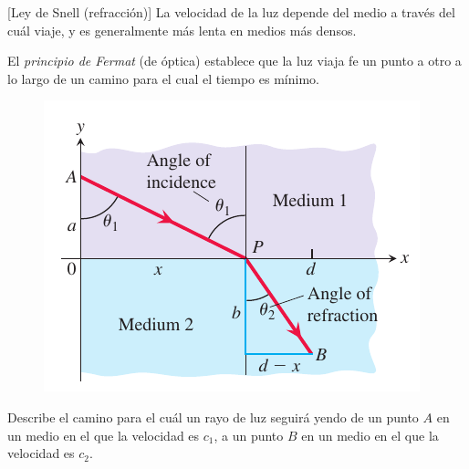 [Ley de Snell (refracción)]
	La velocidad de la luz depende del medio a través del cuál viaje, y es generalmente más lenta en medios más densos.



	El \emph{principio de Fermat} (de óptica) establece que la luz viaja fe un punto a otro a lo largo de un camino para el cual el tiempo es mínimo.




		\begin{figure}
		\centering
		\includegraphics[height=.7\textheight]{./calculo/thomas_04_41}
		\caption{}
		\label{fig:thomas0441}
	\end{figure}
	Describe el camino para el cuál un rayo de luz seguirá yendo de un punto $A$ en un medio en el que la velocidad es $c_1$, a un punto $B$ en un medio en el que la velocidad es $c_2$.


